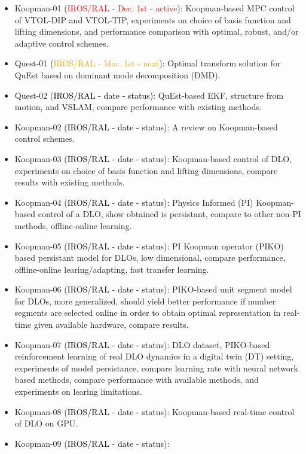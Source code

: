 \documentclass[11pt]{article}
\begin{document}
\begin{itemize}
  \item Koopman-01 (\textcolor{red}{IROS/RAL - Dec. 1st - active}):
  Koopman-based MPC
  control of VTOL-DIP and VTOL-TIP, experiments on choice of basis function and
  lifting dimensions, and performance comparison with optimal, robust, and/or
  adaptive control schemes.\
  \item Quest-01 (\textcolor{orange}{IROS/RAL - Mar. 1st - next}):
  Optimal transform solution for QuEst based on dominant mode decomposition (DMD).
  \item Quest-02 (\textcolor{black}{IROS/RAL - date - status}):
  QuEst-based EKF, structure from motion, and VSLAM, compare performance with
  existing methods.
  \item Koopman-02 (\textcolor{black}{IROS/RAL - date - status}):
  A review on Koopman-based control schemes.
  \item Koopman-03 (\textcolor{black}{IROS/RAL - date - status}):
  Koopman-based control of DLO, experiments on choice of basis function and
  lifting dimensions, compare results with existing methods.
  \item Koopman-04 (\textcolor{black}{IROS/RAL - date - status}):
  Physics Informed (PI) Koopman-based control of a DLO,
  show obtained is persistant, compare to other non-PI methods, offline-online learning.
  \item Koopman-05 (\textcolor{black}{IROS/RAL - date - status}):
  PI Koopman operator (PIKO) based persistant model for DLOs, low dimensional,
  compare performance, offline-online learing/adapting, fast transfer learning.
  \item Koopman-06 (\textcolor{black}{IROS/RAL - date - status}):
  PIKO-based unit segment model for DLOs, more generalized, should yield better
  performance if number segments are selected online in order to
  obtain optimal representation in real-time given available hardware, compare
  results.
  \item Koopman-07 (\textcolor{black}{IROS/RAL - date - status}):
  DLO dataset, PIKO-based reinforcement learning of real DLO dynamics in a
  digital twin (DT) setting,
  experiments of model persistance, compare learning rate
  with neural network based methods, compare performance with available methods,
  and experiments on learing limitations.
  \item Koopman-08 (\textcolor{black}{IROS/RAL - date - status}):
  Koopman-based real-time control of DLO on GPU.
  \item Koopman-09 (\textcolor{black}{IROS/RAL - date - status}):

\end{itemize}
\end{document}
